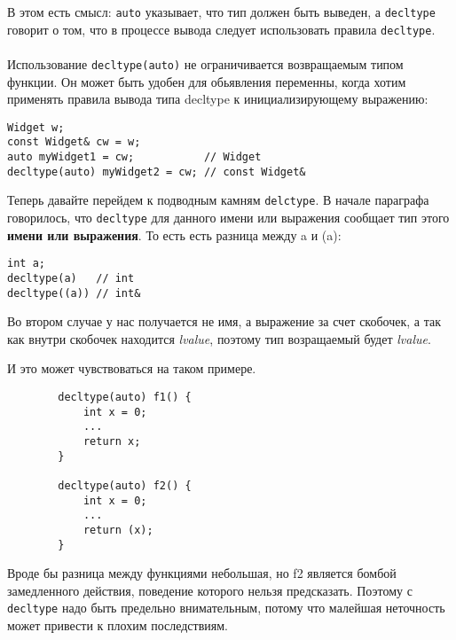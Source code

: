 		В этом есть смысл: \texttt{auto} указывает, что тип должен быть выведен, а \texttt{decltype} говорит о том, что в процессе вывода следует использовать правила \texttt{decltype}. \\\\
		Использование \texttt{decltype(auto)} не ограничивается возвращаемым типом функции. Он может быть удобен для обьявления переменны, когда хотим применять правила вывода типа decltype к инициализирующему выражению:
\begin{verbatim}
Widget w;
const Widget& cw = w;
auto myWidget1 = cw;           // Widget
decltype(auto) myWidget2 = cw; // const Widget&
\end{verbatim}
		Теперь давайте перейдем к подводным камням \texttt{delctype}. В начале параграфа говорилось, что \texttt{decltype} для данного имени или выражения сообщает тип этого \textbf{имени или выражения}. То есть есть разница между a и (a):
\begin{verbatim}
int a;
decltype(a)   // int
decltype((a)) // int&
\end{verbatim}
		Во втором случае у нас получается не имя, а выражение за счет скобочек, а так как внутри скобочек находится \textit{lvalue}, поэтому тип возращаемый будет \textit{lvalue}.
		
		И это может чувствоваться на таком примере.
\begin{verbatim}
		decltype(auto) f1() {
			int x = 0;
			...
			return x;
		}
		
		decltype(auto) f2() {
			int x = 0;
			...
			return (x);
		}
\end{verbatim}
		Вроде бы разница между функциями небольшая, но f2 является бомбой замедленного действия, поведение которого нельзя предсказать. Поэтому с \texttt{decltype} надо быть предельно внимательным, потому что малейшая неточность может привести к плохим последствиям.
